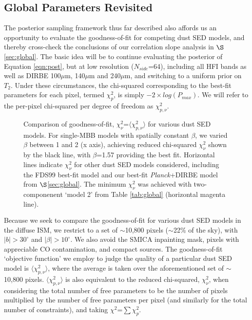 \documentclass{emulateapj}
\newcommand{\PLANCK}{{\it Planck}}
\begin{document}

\subsection{Global Parameters Revisited}
\label{sec:hier}

The posterior sampling framework thus far described also affords us an
opportunity to evaluate the goodness-of-fit for competing dust SED models, and 
thereby cross-check the conclusions of our correlation slope analysis in
$\S$\ref{sec:global}. The basic idea will be to continue evaluating the 
posterior of Equation \ref{eqn:post}, but at low resolution ($N_{side}$=64), 
including all HFI bands as well as DIRBE 100$\mu$m, 140$\mu$m and 240$\mu$m, 
and switching to a uniform prior on $T_2$. Under these circumstances, the 
chi-squared corresponding to the best-fit parameters for each pixel, termed 
$\chi^2_p$, is simply $-2 \times log(P_{max})$. We will refer to the
per-pixel chi-squared per degree of freedom as $\chi^2_{p, \nu}$.

\begin{figure}
\begin{center}
\caption{\label{fig:chi2_dirbe} Comparison of goodness-of-fit, 
$\chi^2_{\nu}$=$\langle \chi^2_{p, \nu} \rangle$ for various dust SED models. 
For single-MBB models with spatially constant $\beta$, we varied $\beta$ 
between 1 and 2 (x axis), achieving reduced chi-squared $\chi^2_{\nu}$ shown by
the black line, with $\beta$=1.57 providing the best fit. Horizontal lines 
indicate $\chi^2_{\nu}$ for other dust SED models considered, including the 
FDS99 best-fit model and our best-fit \PLANCK+DIRBE model from 
$\S$\ref{sec:global}. The minimum $\chi^2_{\nu}$ was achieved with
two-componenent `model 2' from Table \ref{tab:global} (horizontal magenta 
line).}
\end{center}
\end{figure}

Because we seek to compare the goodness-of-fit for various dust SED models in 
the diffuse ISM, we restrict to a set of $\sim$10,800 pixels ($\sim$22\% of the
sky), with $|b|>30^{\circ}$ and $|\beta|>10^{\circ}$. We also avoid the SMICA 
inpainting mask, pixels with appreciable CO contamination, and compact sources.
The goodness-of-fit `objective function' we employ to judge the quality of 
a particular dust SED model is $\langle \chi^2_{p, \nu} \rangle$, where the 
average is taken over the aforementioned set of $\sim$10,800 pixels. 
$\langle \chi_{p, \nu}^2 \rangle$ is also equivalent to the reduced 
chi-squared, $\chi^2_{\nu}$, when considering the total number of free 
parameters to be the number of pixels multiplied by the number of free 
parameters per pixel (and similarly for the total number of constraints), and
taking $\chi^2$=$\sum\chi^2_{p}$.
\end{document}
